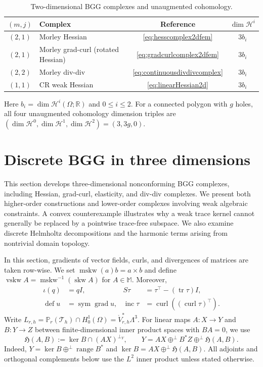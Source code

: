 \documentclass[10pt]{amsart}
\numberwithin{equation}{section}
\newcommand{\curl}{\operatorname{curl}}
\newcommand{\grad}{\operatorname{grad}}
\newcommand{\tr}{\operatorname{tr}}
\newcommand{\sym}{\operatorname{sym}}
\newcommand{\skw}{\operatorname{skw}}
\newcommand{\mskw}{\operatorname{mskw}}
\newcommand{\vskw}{\operatorname{vskw}}
\newcommand{\defm}{\operatorname{def}}
\newcommand{\inc}{\operatorname{inc}}
\begin{document}
\begin{table}[!htbp]
\centering
\caption{Two-dimensional BGG complexes and unaugmented cohomology.}
\label{tab:BGG2dSummary}
\small
\begin{tabularx}{\textwidth}{@{}cXcc@{}}
\toprule
$(m,j)$ & Complex & Reference & $\dim \mathscr H^i$ \\
\midrule
$(2,1)$ & Morley Hessian
& \eqref{eq:hesscomplex2dfem} & $3b_i$ \\
$(2,1)$ & Morley grad-curl (rotated Hessian)
& \eqref{eq:gradcurlcomplex2dfem} & $3b_i$ \\
$(2,2)$ & Morley div-div
& \eqref{eq:continuousdivdivcomplex} & $3b_i$ \\
$(1,1)$ & CR weak Hessian
& \eqref{eq:linearHessian2d} & $3b_i$ \\
\bottomrule
\end{tabularx}
\smallskip

\begin{minipage}{\textwidth}
\footnotesize
Here $b_i=\dim \mathscr H^i(\Omega;\mathbb R)$ and $0\leq i\leq2$.
For a connected polygon with $g$ holes, all four unaugmented cohomology
dimension triples are $(\dim \mathscr H^0,\dim \mathscr H^1,\dim \mathscr H^2)=(3,3g,0)$.
\end{minipage}
\end{table}

\section{Discrete BGG in three dimensions}\label{sec:BGG3d}

This section develops three-dimensional nonconforming BGG complexes,
including Hessian, grad-curl, elasticity, and div-div complexes. We
present both higher-order constructions and lower-order complexes
involving weak algebraic constraints. A convex counterexample
illustrates why a weak trace kernel cannot generally be replaced by a
pointwise trace-free subspace. We also examine discrete Helmholtz
decompositions and the harmonic terms arising from nontrivial domain
topology.

In this section, gradients of vector fields, curls, and divergences of matrices
are taken row-wise. We set $\mskw(a)b=a\times b$ and define
$\vskw A=\mskw^{-1}(\skw A)$ for $A\in\mathbb M$. Moreover,
\begin{align*}
\iota(q)&=qI, & S\tau&=\tau^\top-(\tr\tau)I,\\
\defm u&=\sym\grad u, & \inc\tau&=\curl((\curl\tau)^\top).
\end{align*}
Write $L_{r,h}=\mathbb P_r(\mathcal T_h)\cap H_0^1(\Omega)
=\mathring V_{r,h}^{*}\Lambda^3$.
For linear maps $A:X\to Y$ and $B:Y\to Z$ between finite-dimensional inner
product spaces with $BA=0$, we use
\[
\mathfrak H(A,B):=\ker B\cap (AX)^{\perp_Y},\qquad
Y=AX\oplus^\perp B^*Z\oplus^\perp\mathfrak H(A,B).
\]
Indeed, $Y=\ker B\oplus^\perp\operatorname{range}B^*$ and
$\ker B=AX\oplus^\perp\mathfrak H(A,B)$. All adjoints and orthogonal
complements below use the $L^2$ inner product unless stated otherwise.
\end{document}
